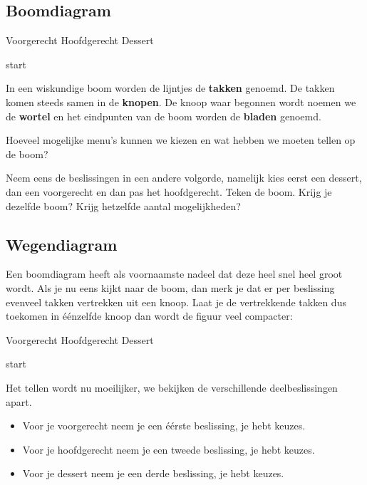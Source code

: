 \documentclass[12pt,twoside]{article}
\begin{document}
\begin{cursus}
\subsection{Boomdiagram}

\hspace*{2cm} Voorgerecht \hfill Hoofdgerecht \hfill Dessert \hspace*{2cm}

\vspace*{8cm}
start
\vspace*{8cm}

In een wiskundige boom worden de lijntjes de {\bf takken} genoemd. De takken komen steeds samen in de {\bf knopen}. De knoop waar begonnen wordt noemen we de {\bf wortel} en het eindpunten van de boom worden de {\bf bladen} genoemd.

Hoeveel mogelijke menu's kunnen we kiezen en wat hebben we moeten tellen op de boom?

Neem eens de beslissingen in een andere volgorde, namelijk kies eerst een dessert, dan een voorgerecht en dan pas het hoofdgerecht. Teken de boom. Krijg je dezelfde boom? Krijg hetzelfde aantal mogelijkheden?

\subsection{Wegendiagram}

Een boomdiagram heeft als voornaamste nadeel dat deze heel snel heel groot wordt. Als je nu eens kijkt naar de boom, dan merk je dat er per beslissing evenveel takken vertrekken uit een knoop. Laat je de vertrekkende takken dus toekomen in éénzelfde knoop dan wordt de figuur veel compacter:

\hspace*{2cm} Voorgerecht \hfill Hoofdgerecht \hfill Dessert \hspace*{2cm}

\vspace*{3cm}
start
\vspace*{3cm}

Het tellen wordt nu moeilijker, we bekijken de verschillende deelbeslissingen apart.
\begin{itemize}
  \item Voor je voorgerecht neem je een éérste beslissing, je hebt \arule{2cm} keuzes.
  \item Voor je hoofdgerecht neem je een tweede beslissing, je hebt \arule{2cm} keuzes.
  \item Voor je dessert neem je een derde beslissing, je hebt \arule{2cm} keuzes.
\end{itemize}


\end{cursus}
\end{document}
